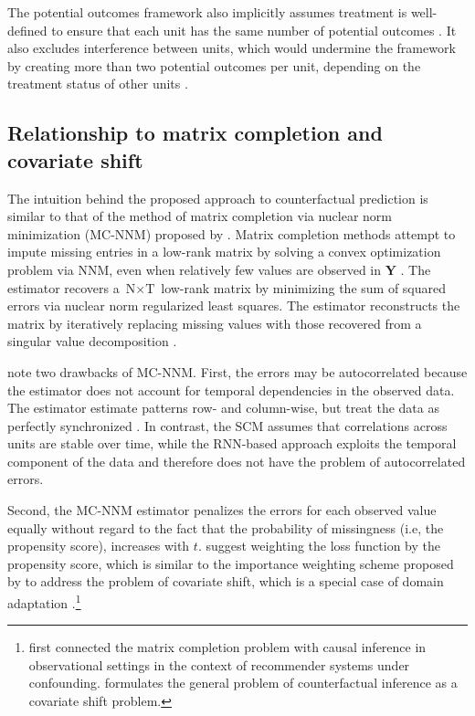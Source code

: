 \documentclass[hidelinks,12pt]{article}
\begin{document}
The potential outcomes framework also implicitly assumes treatment is well-defined to ensure that each unit has the same number of potential outcomes \citep{imbens2015causal}. It also excludes interference between units, which would undermine the framework by creating more than two potential outcomes per unit, depending on the treatment status of other units \citep{rubin1990}.

\subsection{Relationship to matrix completion and covariate shift}

The intuition behind the proposed approach to counterfactual prediction is similar to that of the method of matrix completion via nuclear norm minimization (MC-NNM) proposed by \citet{athey2017matrix}. Matrix completion methods attempt to impute missing entries in a low-rank matrix by solving a convex optimization problem via NNM, even when relatively few values are observed in $\boldsymbol{Y}$ \citep{candes2009exact,candes2010matrix}. The estimator recovers a $\text{N} \times \text{T}$ low-rank matrix by minimizing the sum of squared errors via nuclear norm regularized least squares. The estimator reconstructs the matrix by iteratively replacing missing values with those recovered from a singular value decomposition \citep{mazumder2010spectral}. 

\citet{athey2017matrix} note two drawbacks of MC-NNM. First, the errors may be autocorrelated because the estimator does not account for temporal dependencies in the observed data. The estimator estimate patterns row- and column-wise, but treat the data as perfectly synchronized \citep{yoon2018estimating}. In contrast, the SCM assumes that correlations across units are stable over time, while the RNN-based approach exploits the temporal component of the data and therefore does not have the problem of autocorrelated errors. 

Second, the MC-NNM estimator penalizes the errors for each observed value equally without regard to the fact that the probability of missingness (i.e, the propensity score), increases with $t$. \citet{athey2017matrix} suggest weighting the loss function by the propensity score, which is similar to the importance weighting scheme proposed by \citet{cortes2008sample} to address the problem of covariate shift, which is a special case of domain adaptation \citep{huang2007correcting,ben2007analysis,bickel2009discriminative,cortes2010learning,2015arXiv150507818G}.\footnote{\citet{schnabel2016recommendations} first connected the matrix completion problem with causal inference in observational settings in the context of recommender systems under confounding. \citet{johansson2016learning} formulates the general problem of counterfactual inference as a covariate shift problem.} 
\end{document}
